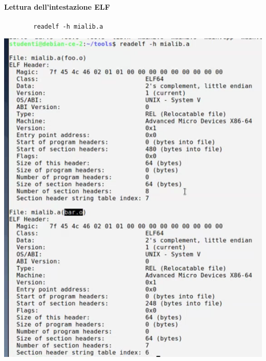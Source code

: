 \begin{multicols}{2}
	\paragraph{Lettura dell'intestazione ELF}
	\begin{verbatim}
		readelf -h mialib.a
	\end{verbatim}
	\begin{center}
		\includegraphics[scale=0.70]{img/61.png}
	\end{center}
	\columnbreak

\end{multicols}
